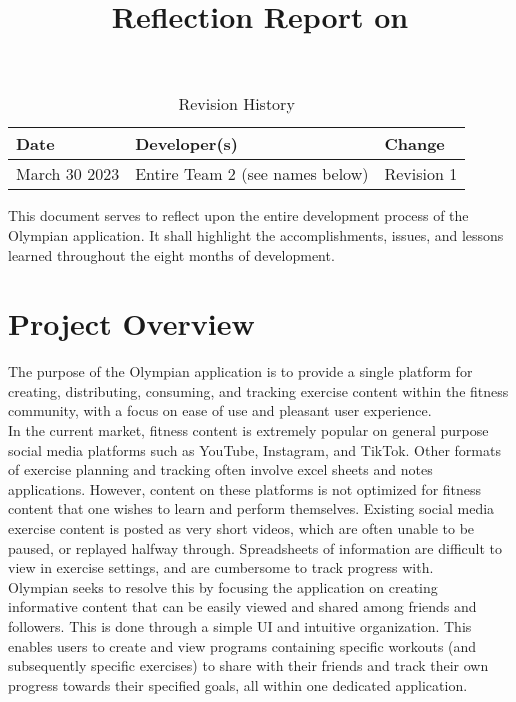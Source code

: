 \documentclass{article}
\title{Reflection Report on \progname}
\author{\authname}
\date{}
\begin{document}
\begin{table}[hp]
\caption{Revision History} \label{TblRevisionHistory}
\begin{tabularx}{\textwidth}{llX}
\toprule
\textbf{Date} & \textbf{Developer(s)} & \textbf{Change}\\
\midrule
March 30 2023 & Entire Team 2 (see names below)& Revision 1\\
\bottomrule
\end{tabularx}
\end{table}

\newpage

\maketitle

This document serves to reflect upon the entire development process of the Olympian application. It shall highlight the accomplishments, issues, and lessons learned throughout the eight months of development.

\section{Project Overview}


The purpose of the Olympian application is to provide a single platform for creating, distributing, consuming, and tracking exercise content within the fitness community, with a focus on ease of use and pleasant user experience.\\

In the current market, fitness content is extremely popular on general purpose social media platforms such as YouTube, Instagram, and TikTok. Other formats of exercise planning and tracking often involve excel sheets and notes applications. However, content on these platforms is not optimized for fitness content that one wishes to learn and perform themselves. Existing social media exercise content is posted as very short videos, which are often unable to be paused, or replayed halfway through. Spreadsheets of information are difficult to view in exercise settings, and are cumbersome to track progress with. \\

Olympian seeks to resolve this by focusing the application on creating informative content that can be easily viewed and shared among friends and followers. This is done through a simple UI and intuitive organization. This enables users to create and view programs containing specific workouts (and subsequently specific exercises) to share with their friends and track their own progress towards their specified goals, all within one dedicated application.
\end{document}
